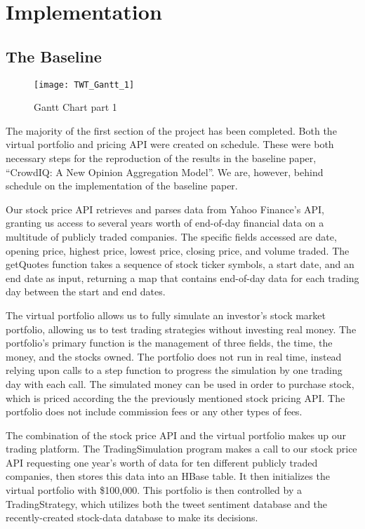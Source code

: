 
\section{Implementation}
\subsection{The Baseline}
\begin{figure}[!ht]
	\centering
	\texttt{[image: TWT\_Gantt\_1]}
	\caption{Gantt Chart part 1}\label{fig:TWT_Gantt_1}
\end{figure}
The majority of the first section of the project has been completed.  Both the virtual portfolio and pricing API were created on schedule.  These were both necessary steps for the reproduction of the results in the baseline paper, “CrowdIQ: A New Opinion Aggregation Model”.  We are, however, behind schedule on the implementation of the baseline paper. 

Our stock price API retrieves and parses data from Yahoo Finance’s API, granting us access to several years worth of end-of-day financial data on a multitude of publicly traded companies.  The specific fields accessed are date, opening price, highest price, lowest price, closing price, and volume traded.  The getQuotes function takes a sequence of stock ticker symbols, a start date, and an end date as input, returning a map that contains end-of-day data for each trading day between the start and end dates.

The virtual portfolio allows us to fully simulate an investor’s stock market portfolio, allowing us to test trading strategies without investing real money.  The portfolio’s primary function is the management of three fields, the time, the money, and the stocks owned.  The portfolio does not run in real time, instead relying upon calls to a step function to progress the simulation by one trading day with each call.  The simulated money can be used in order to purchase stock, which is priced according the the previously mentioned stock pricing API.  The portfolio does not include commission fees or any other types of fees.

The combination of the stock price API and the virtual portfolio makes up our trading platform.  The TradingSimulation program makes a call to our stock price API requesting one year’s worth of data for ten different publicly traded companies, then stores this data into an HBase table.  It then initializes the virtual portfolio with \$100,000.  This portfolio is then controlled by a TradingStrategy, which utilizes both the tweet sentiment database and the recently-created stock-data database to make its decisions.

